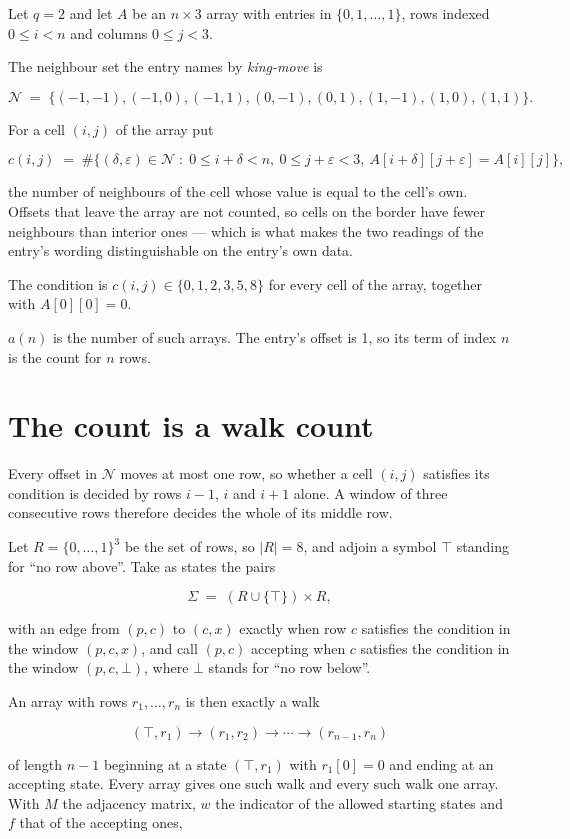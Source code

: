 \documentclass[11pt]{article}
\theoremstyle{definition}
\begin{document}
Let $q = 2$ and let $A$ be an $n \times 3$ array with entries in $\{0,1,\dots,1\}$, rows indexed $0 \le i < n$ and columns $0 \le j < 3$.

The neighbour set the entry names by {\itshape king-move} is

\[\mathcal{N} \;=\; \{(-1,-1), (-1,0), (-1,1), (0,-1), (0,1), (1,-1), (1,0), (1,1)\}.\]

For a cell $(i,j)$ of the array put

\[c(i,j) \;=\; \#\bigl\{(\delta,\varepsilon)\in\mathcal{N} \;:\; 0\le i+\delta<n,\ 0\le j+\varepsilon<3,\ A[i+\delta][j+\varepsilon] = A[i][j]\bigr\},\]

the number of neighbours of the cell whose value is equal to the cell's own. Offsets that leave the array are not counted, so cells on the border have fewer neighbours than interior ones --- which is what makes the two readings of the entry's wording distinguishable on the entry's own data.

The condition is $c(i,j) \in \{0, 1, 2, 3, 5, 8\}$ for every cell of the array, together with $A[0][0]=0$.

$a(n)$ is the number of such arrays. The entry's offset is 1, so its term of index $n$ is the count for $n$ rows.

\section{The count is a walk count}

Every offset in $\mathcal{N}$ moves at most one row, so whether a cell $(i,j)$ satisfies its condition is decided by rows $i-1$, $i$ and $i+1$ alone. A window of three consecutive rows therefore decides the whole of its middle row.

Let $R = \{0,\dots,1\}^{3}$ be the set of rows, so $|R| = 8$, and adjoin a symbol $\top$ standing for ``no row above''. Take as states the pairs

\[\Sigma \;=\; (R \cup \{\top\}) \times R,\]

with an edge from $(p,c)$ to $(c,x)$ exactly when row $c$ satisfies the condition in the window $(p,c,x)$, and call $(p,c)$ accepting when $c$ satisfies the condition in the window $(p,c,\bot)$, where $\bot$ stands for ``no row below''.

An array with rows $r_1,\dots,r_n$ is then exactly a walk

\[(\top,r_1) \to (r_1,r_2) \to \cdots \to (r_{n-1},r_n)\]

of length $n-1$ beginning at a state $(\top,r_1)$ with $r_1[0]=0$ and ending at an accepting state. Every array gives one such walk and every such walk one array. With $M$ the adjacency matrix, $w$ the indicator of the allowed starting states and $f$ that of the accepting ones,
\end{document}
